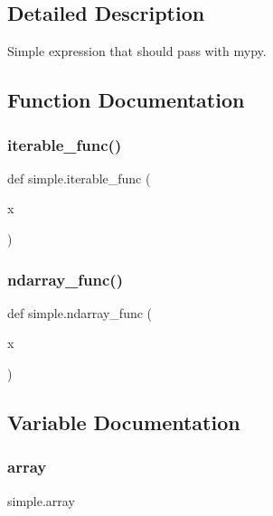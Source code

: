 \subsection{Detailed Description}
\begin{DoxyVerb}Simple expression that should pass with mypy.\end{DoxyVerb}
 

\subsection{Function Documentation}
\mbox{\label{namespacesimple_ac07feb09a2ceca7a728e89ac496199f5}} 
\subsubsection{\texorpdfstring{iterable\+\_\+func()}{iterable\_func()}}
{\footnotesize\ttfamily def simple.\+iterable\+\_\+func (\begin{DoxyParamCaption}\item[{}]{x }\end{DoxyParamCaption})}

\mbox{\label{namespacesimple_a1bf3de4b0946c6322d016915b123900b}} 
\subsubsection{\texorpdfstring{ndarray\+\_\+func()}{ndarray\_func()}}
{\footnotesize\ttfamily def simple.\+ndarray\+\_\+func (\begin{DoxyParamCaption}\item[{}]{x }\end{DoxyParamCaption})}



\subsection{Variable Documentation}
\mbox{\label{namespacesimple_ab05714d4dc40f39388a008b56895cebc}} 
\subsubsection{\texorpdfstring{array}{array}}
{\footnotesize\ttfamily simple.\+array}

